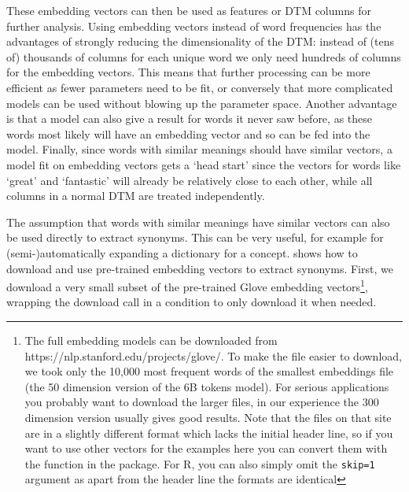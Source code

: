These embedding vectors can then be used as features or DTM columns for further analysis.
Using embedding vectors instead of word frequencies has the advantages of strongly reducing the dimensionality of the DTM:
instead of (tens of) thousands of columns for each unique word we only need hundreds of columns for the embedding vectors.
This means that further processing can be more efficient as fewer parameters need to be fit,
or conversely that more complicated models can be used without blowing up the parameter space.
Another advantage is that a model can also give a result for words it never saw before, as these words most likely will have an embedding vector and so can be fed into the model.
Finally, since words with similar meanings should have similar vectors,
a model fit on embedding vectors gets a `head start' since the vectors for words like `great' and `fantastic' will already be relatively close to each other, while all columns in a normal DTM are treated independently.

\newcommand{\fnglove}{\footnote{The full embedding models can be downloaded from https://nlp.stanford.edu/projects/glove/. To make the file easier to download, we took only the 10,000 most frequent words of the smallest embeddings file (the 50 dimension version of the 6B tokens model). For serious applications you probably want to download the larger files, in our experience the 300 dimension version usually gives good results. Note that the files on that site are in a slightly different format which lacks the initial header line, so if you want to use other vectors for the examples here you can convert them with the \fn{glove2word2vec} function in the \pkg{gensim} package. For R, you can also simply omit the \verb|skip=1| argument as apart from the header line the formats are identical}}

The assumption that words with similar meanings have similar vectors can also be used directly to extract synonyms.
This can be very useful, for example for (semi-)automatically expanding a dictionary for a concept.
 shows how to download and use pre-trained embedding vectors to extract synonyms.
First, we download a very small subset of the pre-trained Glove embedding vectors\fnglove,
wrapping the download call in a condition to only download it when needed.

